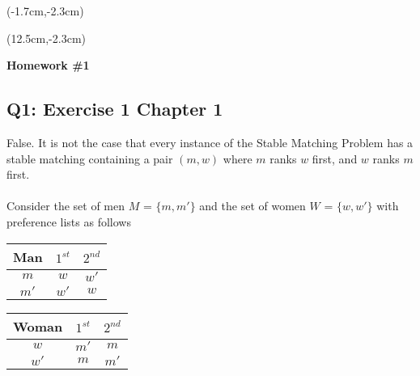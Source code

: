 \documentclass[12pt, oneside]{article}
\begin{document}
\begin{textblock*}{4cm}(-1.7cm,-2.3cm)
\end{textblock*}

\begin{textblock*}{8cm}(12.5cm,-2.3cm)
\end{textblock*}


\vspace{1cm}

\makeatletter
\setlength{\@fptop}{0pt}
\makeatother

\begin{center}
\textbf{\Large Homework \#1}
\end{center}


\subsection*{Q1: Exercise 1 Chapter 1 }
False. It is not the case that every instance of the Stable Matching Problem has a stable matching containing a pair $(m,w)$ where $m$ ranks $w$ first, and $w$ ranks $m$ first.\\\\
Consider the set of men $M$ = $\{m, m'\}$ and the set of women $W$ = $\{w, w'\}$ with preference lists as follows

\begin{center}
  \begin{tabular}{ c | c | c }
    Man & $1^{st}$ & $2^{nd}$ \\ \hline
    $m$ & $w$ & $w'$ \\ \hline
    $m'$ & $w'$ & $w$ \\ \hline
  \end{tabular}
\end{center}

\begin{center}
  \begin{tabular}{ c | c | c }
    Woman & $1^{st}$ & $2^{nd}$ \\ \hline
    $w$ & $m'$ & $m$ \\ \hline
    $w'$ & $m$ & $m'$ \\ \hline
  \end{tabular}
\end{center}
\end{document}
